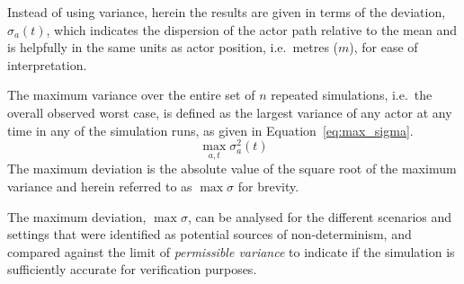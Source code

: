 \documentclass[letterpaper, 10 pt, journal, twoside]{IEEEtran}
\begin{document}
Instead of using variance, herein the results are given in terms of the deviation, $\sigma_a(t)$, which indicates the dispersion of the actor path relative to the mean and is helpfully in the same units as actor position, i.e.\ metres ($m$), for ease of interpretation.
%

The maximum variance over the entire set of $n$ repeated simulations, i.e.\ the overall observed worst case, is defined as the largest variance of any actor at any time in any of the simulation runs, as given in Equation~\ref{eq:max_sigma}. 
\begin{equation} \label{eq:max_sigma}
\max_{a,t}\sigma_a^{2}(t)
\end{equation}
The maximum deviation is the absolute value of the square root of the maximum variance and herein referred to as ${\max\sigma}$ for brevity. 

The maximum deviation, $\max\sigma$, can be analysed for the different scenarios and settings that were identified as potential sources of non-determinism, and compared against the limit of \textit{permissible variance} to indicate if the simulation is sufficiently accurate for verification purposes.
%
\end{document}
